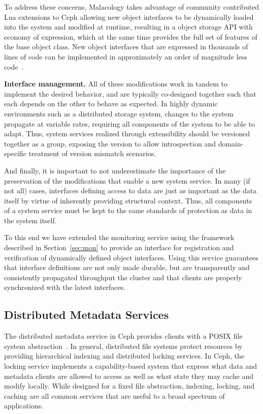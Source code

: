 \documentclass[10pt,twocolumn]{article}
\begin{document}
To address these concerns, Malacology takes advantage of community contributed
Lua extensions to Ceph allowing new object interfaces to be dynamically loaded
into the system and modified at runtime, resulting in a object storage API
with economy of expression, which at the same time provides the full set of
features of the base object class. New object interfaces that are
expressed in thousands of lines of code can be implemented in approximately an
order of magnitude less code~\cite{geambasu_comet_2010}.

{\bf Interface management.} All of these modifications work in tandem to
implement the desired behavior, and are typically co-designed together such
that each depends on the other to behave as expected. In highly dynamic
environments such as a distributed storage system, changes to the system
propagate at variable rates, requiring all components of the system to be able
to adapt. Thus, system services realized through extensibility should be
versioned together as a group, exposing the version to allow introspection and
domain-specific treatment of version mismatch scenarios.

And finally, it is important to not underestimate the importance of the
preservation of the modifications that enable a new system service. In many
(if not all) cases, interfaces defining access to data are just as important
as the data itself by virtue of inherently providing structural context. Thus,
all components of a system service must be kept to the same standards of
protection as data in the system itself.

To this end we have extended the monitoring service using the framework
described in Section~\ref{sec:mon} to provide an interface for registration
and verification of dynamically defined object interfaces. Using this service
guarantees that interface definitions are not only made durable, but are
transparently and consistently propagated throughput the cluster and that
clients are properly synchronized with the latest interfaces.

\subsection{Distributed Metadata Services}
\label{malacology:mds}

The distributed metadata service in Ceph provides clients with a POSIX file
system abstraction~\cite{weil:sc2004-dyn-metadata}. In general, distributed
file systems protect resources by providing hierarchical indexing and
distributed locking services.  In Ceph, the locking service implements a
capability-based system that express what data and metadata clients are allowed
to access as well as what state they may cache and modify locally. While
designed for a fixed file abstraction, indexing, locking, and caching are all
common services that are useful to a broad spectrum of applications.
\end{document}
